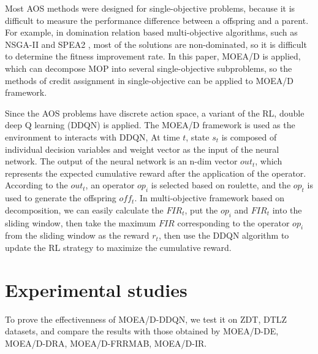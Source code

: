 \documentclass[journal]{IEEEtran}
\begin{document}
Most AOS methods were designed for single-objective problems, because it is difficult to measure the performance difference between a offspring and a parent.
For example, in domination relation based multi-objective algorithms, such as NSGA-II \cite{nsga2} and SPEA2 \cite{spea2}, most of the solutions are non-dominated, so it is difficult to determine the fitness improvement rate.
In this paper, MOEA/D is applied, which can decompose MOP into several single-objective subproblems, so the methods of credit assignment in single-objective can be applied to MOEA/D framework.

Since the AOS problems have discrete action space, a variant of the RL, double deep Q learning (DDQN) is applied.
The MOEA/D framework is used as the environment to interacts with DDQN,
At time $t$, state $s_t$ is composed of individual decision variables and weight vector as the input of the neural network. The output of the neural network is an n-dim vector $out_t$, which represents the expected cumulative reward after the application of the operator.
According to the $out_t$, an operator $op_i$ is selected based on roulette, and the $op_t$ is used to generate the offspring $off_t$. In multi-objective framework based on decomposition, we can easily calculate the $FIR_t$, put the $op_i$ and $FIR_t$ into the sliding window, then take the maximum $FIR$ corresponding to the operator $op_i$ from the sliding window as the reward $r_t$, then use the DDQN algorithm to update the RL strategy to maximize the cumulative reward.



\section{Experimental studies}
To prove the effectivenness of MOEA/D-DDQN, we test it on ZDT, DTLZ datasets, and compare the results with those obtained by MOEA/D-DE, MOEA/D-DRA, MOEA/D-FRRMAB, MOEA/D-IR.
\end{document}
